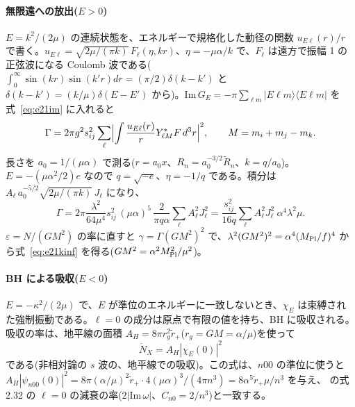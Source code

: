 \paragraph{無限遠への放出($E>0$)}
$E=k^2/(2\mu)$ の連続状態を、エネルギーで規格化した動径の関数 $u_{E\ell}(r)/r$ で書く。$u_{E\ell}=\sqrt{2\mu/(\pi k)}\,F_\ell(\eta,kr)$、$\eta=-\mu\alpha/k$ で、$F_\ell$ は遠方で振幅 1 の正弦波になる Coulomb 波である($\int_0^\infty\sin(kr)\sin(k'r)dr=(\pi/2)\delta(k-k')$ と $\delta(k-k')=(k/\mu)\delta(E-E')$ から)。$\mathrm{Im}\,G_E=-\pi\sum_{\ell m}|E\ell m\rangle\langle E\ell m|$ を式~\eqref{eq:e21im} に入れると
\begin{equation}
\Gamma=2\pi g^2s_{ij}^2\sum_\ell\Bigl|\int\frac{u_{E\ell}(r)}{r}Y^*_{\ell M}F\,d^3r\Bigr|^2,\qquad M=m_i+m_j-m_k.
\end{equation}
長さを $a_0=1/(\mu\alpha)$ で測る($r=a_0x$、$R_n=a_0^{-3/2}\tilde R_n$、$k=q/a_0$)。$E=-(\mu\alpha^2/2)e$ なので $q=\sqrt{-e}$、$\eta=-1/q$ である。積分は $A_\ell\,a_0^{-5/2}\sqrt{2\mu/(\pi k)}\,J_\ell$ になり、
\begin{equation}
\Gamma=2\pi\frac{\lambda^2}{64\mu^4}s_{ij}^2\,(\mu\alpha)^5\,\frac{2}{\pi q\alpha}\sum_\ell A_\ell^2J_\ell^2
=\frac{s_{ij}^2}{16q}\sum_\ell A_\ell^2J_\ell^2\ \alpha^4\lambda^2\mu.
\end{equation}
$\varepsilon=N/(GM^2)$ の率に直すと $\gamma=\Gamma(GM^2)^2$ で、$\lambda^2(GM^2)^2=\alpha^4(M_\mathrm{Pl}/f)^4$ から式~\eqref{eq:e21kinf} を得る($GM^2=\alpha^2M_\mathrm{Pl}^2/\mu^2$)。

\paragraph{BH による吸収($E<0$)}
$E=-\kappa^2/(2\mu)$ で、$E$ が準位のエネルギーに一致しないとき、$\chi_E$ は束縛された強制振動である。$\ell=0$ の成分は原点で有限の値を持ち、BH に吸収される。吸収の率は、地平線の面積 $A_H=8\pi r_g^2\tilde r_+$($r_g=GM=\alpha/\mu$)を使って
\begin{equation}
\dot N_X=A_H|\chi_E(0)|^2
\label{eq:e21abs}
\end{equation}
である(非相対論の $s$ 波の、地平線での吸収)。この式は、$n00$ の準位に使うと $A_H|\psi_{n00}(0)|^2=8\pi(\alpha/\mu)^2\tilde r_+\cdot4(\mu\alpha)^3/(4\pi n^3)=8\alpha^5\tilde r_+\mu/n^3$ を与え、 の式 2.32 の $\ell=0$ の減衰の率($2|\mathrm{Im}\,\omega|$、$C_{n0}=2/n^3$)と一致する。

